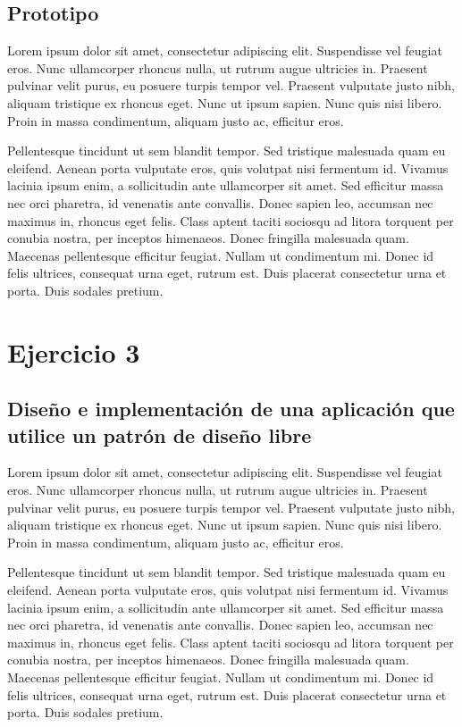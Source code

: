 \documentclass{article}
\begin{document}
	\subsection{Prototipo}
	
	
	Lorem ipsum dolor sit amet, consectetur adipiscing elit. Suspendisse vel feugiat eros. Nunc ullamcorper rhoncus nulla, ut rutrum augue ultricies in. Praesent pulvinar velit purus, eu posuere turpis tempor vel. Praesent vulputate justo nibh, aliquam tristique ex rhoncus eget. Nunc ut ipsum sapien. Nunc quis nisi libero. Proin in massa condimentum, aliquam justo ac, efficitur eros.
	
	Pellentesque tincidunt ut sem blandit tempor. Sed tristique malesuada quam eu eleifend. Aenean porta vulputate eros, quis volutpat nisi fermentum id. Vivamus lacinia ipsum enim, a sollicitudin ante ullamcorper sit amet. Sed efficitur massa nec orci pharetra, id venenatis ante convallis. Donec sapien leo, accumsan nec maximus in, rhoncus eget felis. Class aptent taciti sociosqu ad litora torquent per conubia nostra, per inceptos himenaeos. Donec fringilla malesuada quam. Maecenas pellentesque efficitur feugiat. Nullam ut condimentum mi. Donec id felis ultrices, consequat urna eget, rutrum est. Duis placerat consectetur urna et porta. Duis sodales pretium. 
	\section{Ejercicio 3}
	\subsection{Diseño e implementación de una aplicación que utilice un patrón de diseño libre}


Lorem ipsum dolor sit amet, consectetur adipiscing elit. Suspendisse vel feugiat eros. Nunc ullamcorper rhoncus nulla, ut rutrum augue ultricies in. Praesent pulvinar velit purus, eu posuere turpis tempor vel. Praesent vulputate justo nibh, aliquam tristique ex rhoncus eget. Nunc ut ipsum sapien. Nunc quis nisi libero. Proin in massa condimentum, aliquam justo ac, efficitur eros.

Pellentesque tincidunt ut sem blandit tempor. Sed tristique malesuada quam eu eleifend. Aenean porta vulputate eros, quis volutpat nisi fermentum id. Vivamus lacinia ipsum enim, a sollicitudin ante ullamcorper sit amet. Sed efficitur massa nec orci pharetra, id venenatis ante convallis. Donec sapien leo, accumsan nec maximus in, rhoncus eget felis. Class aptent taciti sociosqu ad litora torquent per conubia nostra, per inceptos himenaeos. Donec fringilla malesuada quam. Maecenas pellentesque efficitur feugiat. Nullam ut condimentum mi. Donec id felis ultrices, consequat urna eget, rutrum est. Duis placerat consectetur urna et porta. Duis sodales pretium. 
\end{document}
